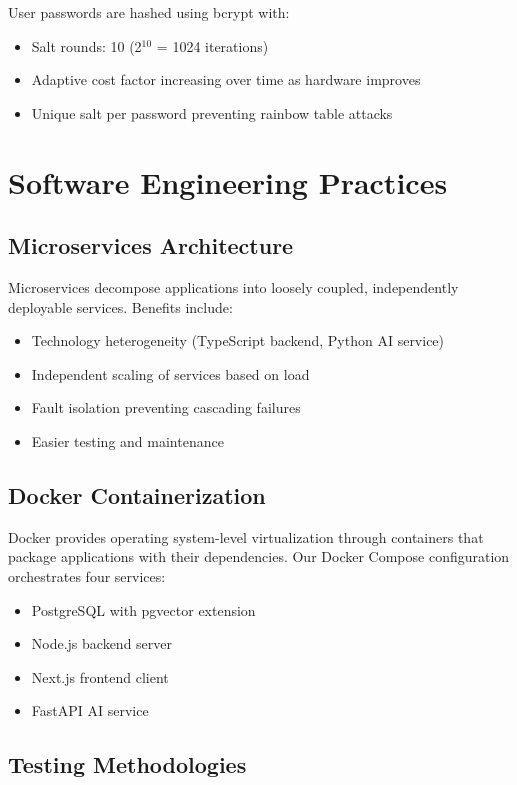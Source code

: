 \documentclass[12pt]{report}
\begin{document}
User passwords are hashed using bcrypt with:
\begin{itemize}
    \item Salt rounds: 10 (2$^{10}$ = 1024 iterations)
    \item Adaptive cost factor increasing over time as hardware improves
    \item Unique salt per password preventing rainbow table attacks
\end{itemize}

\section{Software Engineering Practices}

\subsection{Microservices Architecture}

Microservices decompose applications into loosely coupled, independently deployable services. Benefits include:
\begin{itemize}
    \item Technology heterogeneity (TypeScript backend, Python AI service)
    \item Independent scaling of services based on load
    \item Fault isolation preventing cascading failures
    \item Easier testing and maintenance
\end{itemize}

\subsection{Docker Containerization}

Docker provides operating system-level virtualization through containers that package applications with their dependencies. Our Docker Compose configuration orchestrates four services:
\begin{itemize}
    \item PostgreSQL with pgvector extension
    \item Node.js backend server
    \item Next.js frontend client
    \item FastAPI AI service
\end{itemize}

\subsection{Testing Methodologies}
\end{document}
